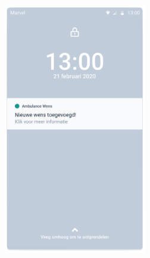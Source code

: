 \begin{figure}[!h]
\begin{subfigure}[h]{0.3\textwidth}
  \end{subfigure}
  \begin{subfigure}[h]{0.3\textwidth}
    \centering
    \includegraphics[width=0.685\textwidth]{images/care-athon/notificatie.png}
  \end{subfigure}
\end{figure}